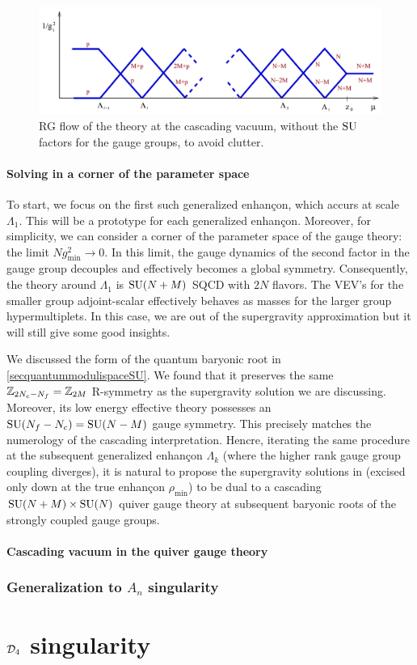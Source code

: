     \begin{figure}[H]
        \centering
        \includegraphics[scale=0.3]{Pictures/RGflowcascade.png}
        \caption{RG flow of the theory at the cascading vacuum, without the $\text{SU}$ factors for the gauge groups, to avoid clutter.}
    \end{figure}

    \subsection{Solving in a corner of the parameter space}

        To start, we focus on the first such generalized enhançon, which accurs at scale $\Lambda_1$. This will be a prototype for each generalized enhançon. Moreover, for simplicity, we can consider a corner of the parameter space of the gauge theory: the limit $Ng^2_{\text{min}}\to0$. In this limit, the gauge dynamics of the second factor in the gauge group decouples and effectively becomes a global symmetry. Consequently, the theory around $\Lambda_1$ is $\text{SU}(N+M)$ SQCD with $2N$ flavors. The VEV's for the smaller group adjoint-scalar effectively behaves as masses for the larger group hypermultiplets. In this case, we are out of the supergravity approximation but it will still give some good insights.

        We discussed the form of the quantum baryonic root in \ref{secquantummodulispaceSU}. We found that it preserves the same $\mathbb{Z}_{2N_c-N_f}=\mathbb{Z}_{2M}$ R-symmetry as the supergravity solution we are discussing. Moreover, its low energy effective theory possesses an $\text{SU}(N_f-N_c)=\text{SU}(N-M)$ gauge symmetry. This precisely matches the numerology of the cascading interpretation. Hencre, iterating the same procedure at the subsequent generalized enhançon $\Lambda_k$ (where the higher rank gauge group coupling diverges), it is natural to propose the supergravity solutions in  (excised only down at the true enhançon $\rho_{\text{min}}$) to be dual to a cascading $\text{SU}(N+M)\times\text{SU}(N)$ quiver gauge theory at subsequent baryonic roots of the strongly coupled gauge groups.

    \subsection{Cascading vacuum in the quiver gauge theory}



    



\section{Generalization to $A_n$ singularity}

\part{$\mathcal{D}_4$ singularity}